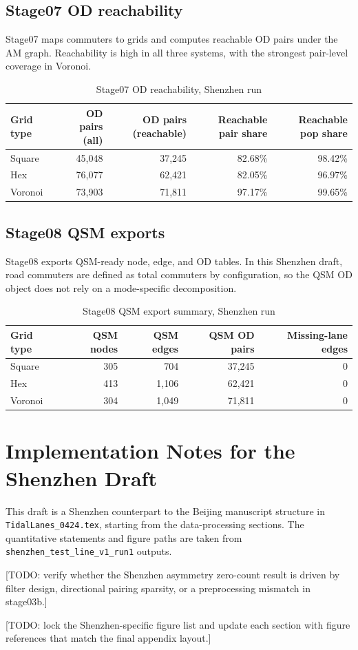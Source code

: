 \documentclass[12pt]{article}
\begin{document}
\subsection{Stage07 OD reachability}

Stage07 maps commuters to grids and computes reachable OD pairs under the AM graph. Reachability is high in all three systems, with the strongest pair-level coverage in Voronoi.

\begin{table}[h!]
\centering
\caption{Stage07 OD reachability, Shenzhen run}
\label{tab:sz_stage07_summary}
\begin{tabular}{lrrrr}
\toprule
Grid type & OD pairs (all) & OD pairs (reachable) & Reachable pair share & Reachable pop share \\
\midrule
Square & 45,048 & 37,245 & 82.68\% & 98.42\% \\
Hex & 76,077 & 62,421 & 82.05\% & 96.97\% \\
Voronoi & 73,903 & 71,811 & 97.17\% & 99.65\% \\
\bottomrule
\end{tabular}
\end{table}

\subsection{Stage08 QSM exports}

Stage08 exports QSM-ready node, edge, and OD tables. In this Shenzhen draft, road commuters are defined as total commuters by configuration, so the QSM OD object does not rely on a mode-specific decomposition.

\begin{table}[h!]
\centering
\caption{Stage08 QSM export summary, Shenzhen run}
\label{tab:sz_stage08_summary}
\begin{tabular}{lrrrr}
\toprule
Grid type & QSM nodes & QSM edges & QSM OD pairs & Missing-lane edges \\
\midrule
Square & 305 & 704 & 37,245 & 0 \\
Hex & 413 & 1,106 & 62,421 & 0 \\
Voronoi & 304 & 1,049 & 71,811 & 0 \\
\bottomrule
\end{tabular}
\end{table}

\section{Implementation Notes for the Shenzhen Draft}

This draft is a Shenzhen counterpart to the Beijing manuscript structure in \texttt{TidalLanes\_0424.tex}, starting from the data-processing sections. The quantitative statements and figure paths are taken from \texttt{shenzhen\_test\_line\_v1\_run1} outputs.

[TODO: verify whether the Shenzhen asymmetry zero-count result is driven by filter design, directional pairing sparsity, or a preprocessing mismatch in stage03b.]

[TODO: lock the Shenzhen-specific figure list and update each section with figure references that match the final appendix layout.]
\end{document}
